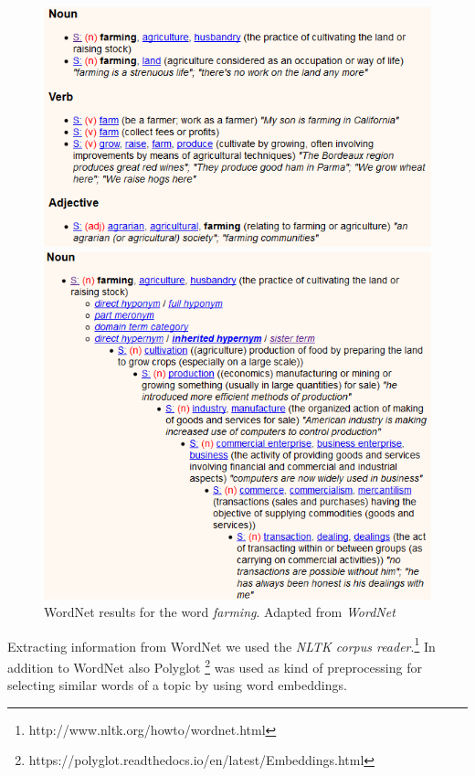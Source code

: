 \begin{figure}
	\begin{minipage}{0.5\textwidth}
		\includegraphics[width=\textwidth]{gfx/Wordnet/farming.png}
	\end{minipage}
	\begin{minipage}{0.5\textwidth}
		\includegraphics[width=\textwidth]{gfx/Wordnet/farmingTree.png}
	\end{minipage}
	\caption[WordNet results for the word \textit{farming}]{WordNet results for the word \textit{farming}. Adapted from \textit{WordNet}}
	\label{pic:Wordnet}
\end{figure}

Extracting information from WordNet we used the \textit{NLTK corpus reader}.\footnote{http://www.nltk.org/howto/wordnet.html} In addition to WordNet also Polyglot \footnote{https://polyglot.readthedocs.io/en/latest/Embeddings.html} was used as kind of preprocessing for selecting similar words of a topic by using word embeddings.
